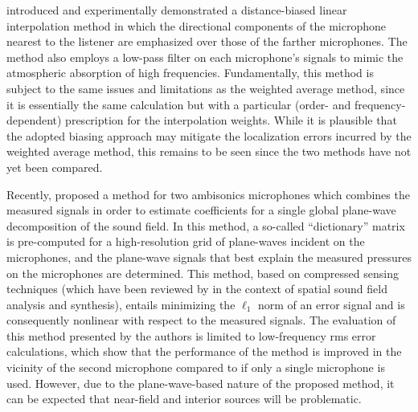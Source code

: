\citet{Patricio2019} introduced and experimentally demonstrated a distance-biased linear interpolation method in which the directional components of the microphone nearest to the listener are emphasized over those of the farther microphones.
The method also employs a low-pass filter on each microphone's signals to mimic the atmospheric absorption of high frequencies.
Fundamentally, this method is subject to the same issues and limitations as the weighted average method, since it is essentially the same calculation but with a particular (order- and frequency-dependent) prescription for the interpolation weights.
While it is plausible that the adopted biasing approach may mitigate the localization errors incurred by the weighted average method, this remains to be seen since the two methods have not yet been compared.

Recently, \citet{Emura2017} proposed a method for two ambisonics microphones which combines the measured signals in order to estimate coefficients for a single global plane-wave decomposition of the sound field.
In this method, a so-called ``dictionary'' matrix is pre-computed for a high-resolution grid of plane-waves incident on the microphones, and the plane-wave signals that best explain the measured pressures on the microphones are determined.
This method, based on compressed sensing techniques (which have been reviewed by \citet{Epain2009} in the context of spatial sound field analysis and synthesis), entails minimizing the $\ell_1$ norm of an error signal \citep[see Eq.~(20)]{Emura2017} and is consequently nonlinear with respect to the measured signals.
The evaluation of this method presented by the authors is limited to low-frequency rms error calculations, which show that the performance of the method is improved in the vicinity of the second microphone compared to if only a single microphone is used. %
However, due to the plane-wave-based nature of the proposed method, it can be expected that near-field and interior sources will be problematic.


